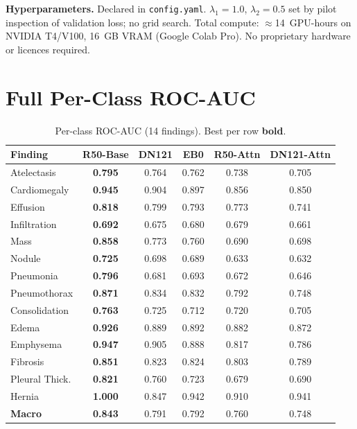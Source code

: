 \documentclass[10pt,twocolumn,letterpaper]{article}
\begin{document}
\noindent\textbf{Hyperparameters.} Declared in \texttt{config.yaml}.
$\lambda_1\!=\!1.0$, $\lambda_2\!=\!0.5$ set by pilot inspection of validation
loss; no grid search. Total compute: $\approx$14~GPU-hours on NVIDIA T4/V100,
16~GB VRAM (Google Colab Pro). No proprietary hardware or licences required.




\appendix
\section{Full Per-Class ROC-AUC}
\label{app:perclass}

\begin{table}[t]
\centering
\caption{Per-class ROC-AUC (14 findings). Best per row \textbf{bold}.}
\label{tab:perclass_auc}
\setlength{\tabcolsep}{2.5pt}
{\scriptsize
\begin{tabular}{lccccc}
\toprule
\textbf{Finding} & \textbf{R50-Base} & \textbf{DN121} &
  \textbf{EB0} & \textbf{R50-Attn} & \textbf{DN121-Attn}\\
\midrule
Atelectasis        & \textbf{0.795} & 0.764 & 0.762 & 0.738 & 0.705\\
Cardiomegaly       & \textbf{0.945} & 0.904 & 0.897 & 0.856 & 0.850\\
Effusion           & \textbf{0.818} & 0.799 & 0.793 & 0.773 & 0.741\\
Infiltration       & \textbf{0.692} & 0.675 & 0.680 & 0.679 & 0.661\\
Mass               & \textbf{0.858} & 0.773 & 0.760 & 0.690 & 0.698\\
Nodule             & \textbf{0.725} & 0.698 & 0.689 & 0.633 & 0.632\\
Pneumonia          & \textbf{0.796} & 0.681 & 0.693 & 0.672 & 0.646\\
Pneumothorax       & \textbf{0.871} & 0.834 & 0.832 & 0.792 & 0.748\\
Consolidation      & \textbf{0.763} & 0.725 & 0.712 & 0.720 & 0.705\\
Edema              & \textbf{0.926} & 0.889 & 0.892 & 0.882 & 0.872\\
Emphysema          & \textbf{0.947} & 0.905 & 0.888 & 0.817 & 0.786\\
Fibrosis           & \textbf{0.851} & 0.823 & 0.824 & 0.803 & 0.789\\
Pleural Thick.     & \textbf{0.821} & 0.760 & 0.723 & 0.679 & 0.690\\
Hernia             & \textbf{1.000} & 0.847 & 0.942 & 0.910 & 0.941\\
\midrule
\textbf{Macro}     & \textbf{0.843} & 0.791 & 0.792 & 0.760 & 0.748\\
\bottomrule
\end{tabular}}
\end{table}
\end{document}
